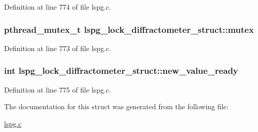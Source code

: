 Definition at line 774 of file lspg.\-c.

\hypertarget{structlspg__lock__diffractometer__struct_a362e848dfd1551428b8d12d8776fd2ed}{
\subsubsection[{mutex}]{\setlength{\rightskip}{0pt plus 5cm}pthread\-\_\-mutex\-\_\-t lspg\-\_\-lock\-\_\-diffractometer\-\_\-struct\-::mutex}}\label{structlspg__lock__diffractometer__struct_a362e848dfd1551428b8d12d8776fd2ed}


Definition at line 773 of file lspg.\-c.

\hypertarget{structlspg__lock__diffractometer__struct_ae94acdf44008ce48930e3083f08f5b6c}{
\subsubsection[{new\-\_\-value\-\_\-ready}]{\setlength{\rightskip}{0pt plus 5cm}int lspg\-\_\-lock\-\_\-diffractometer\-\_\-struct\-::new\-\_\-value\-\_\-ready}}\label{structlspg__lock__diffractometer__struct_ae94acdf44008ce48930e3083f08f5b6c}


Definition at line 775 of file lspg.\-c.



The documentation for this struct was generated from the following file\-:\begin{DoxyCompactItemize}
\item 
\hyperlink{lspg_8c}{lspg.\-c}\end{DoxyCompactItemize}
